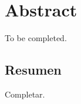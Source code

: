 \begingroup
\let\clearpage\relax
\let\cleardoublepage\relax
\let\cleardoublepage\relax

\chapter*{Abstract}
To be completed.

\vfill

\begin{otherlanguage}{spanish}
\chapter*{Resumen}
Completar.
\end{otherlanguage}

\endgroup

\vfill
